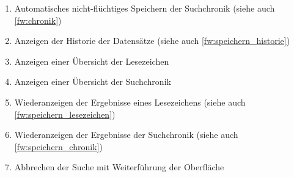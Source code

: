 \begin{enumerate} [label=\bfseries /FW \arabic*0/, leftmargin=*]
	\item Automatisches nicht-flüchtiges Speichern der Suchchronik (siehe auch \ref{fw:chronik}) \label{fw:speichern_chronik}
	\item Anzeigen der Historie der Datensätze (siehe auch \ref{fw:speichern_historie}) \label{fw:historie_uebersicht}
	\item Anzeigen einer Übersicht der Lesezeichen \label{fw:lesezeichen_uebersicht}
	\item Anzeigen einer Übersicht der Suchchronik \label{fw:chronik_uebersicht}
	\item Wiederanzeigen der Ergebnisse eines Lesezeichens (siehe auch \ref{fw:speichern_lesezeichen}) \label{fw:lesezeichen}
	\item Wiederanzeigen der Ergebnisse der Suchchronik (siehe auch \ref{fw:speichern_chronik}) \label{fw:chronik}
	\newline
	\item Abbrechen der Suche mit Weiterführung der Oberfläche \label{fw:suche_abbrechen}
\end{enumerate}
\pagebreak
